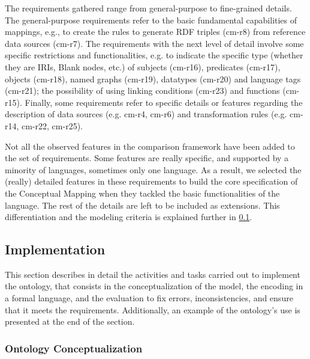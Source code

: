 The requirements gathered range from general-purpose to fine-grained details. The general-purpose requirements refer to the basic fundamental capabilities of mappings, e.g., to create the rules to generate RDF triples (cm-r8) from reference data sources (cm-r7). The requirements with the next level of detail involve some specific restrictions and functionalities, e.g. to indicate the specific type (whether they are IRIs, Blank nodes, etc.) of subjects (cm-r16), predicates (cm-r17), objects (cm-r18), named graphs (cm-r19), datatypes (cm-r20) and language tags (cm-r21); the possibility of using linking conditions (cm-r23) and functions (cm-r15). Finally, some requirements refer to specific details or features regarding the description of data sources (e.g. cm-r4, cm-r6) and transformation rules (e.g. cm-r14, cm-r22, cm-r25).

Not all the observed features in the comparison framework have been added to the set of requirements. Some features are really specific, and supported by a minority of languages, sometimes only one language. As a result, we selected the (really) detailed features in these requirements to build the core specification of the Conceptual Mapping when they tackled the basic functionalities of the language. The rest of the details are left to be included as extensions. This differentiation and the modeling criteria is explained further in \cref{sec:chp4_implementation}.










\subsection{Implementation}
\label{sec:chp4_implementation}

This section describes in detail the activities and tasks carried out to implement the ontology, that consists in the conceptualization of the model, the encoding in a formal language, and the evaluation to fix errors, inconsistencies, and ensure that it meets the requirements. Additionally, an example of the ontology's use is presented at the end of the section.



\subsubsection{Ontology Conceptualization}




